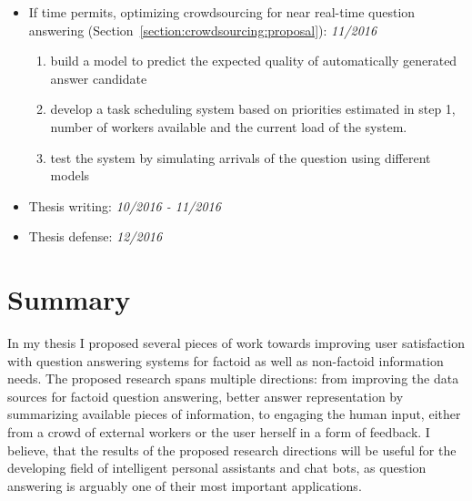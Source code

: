 \begin{itemize}
\item If time permits, optimizing crowdsourcing for near real-time question answering (Section~\ref{section:crowdsourcing:proposal}): \textit{11/2016}
\begin{enumerate}
	\item build a model to predict the expected quality of automatically generated answer candidate
	\item develop a task scheduling system based on priorities estimated in step 1, number of workers available and the current load of the system.
	\item test the system by simulating arrivals of the question using different models
\end{enumerate}


\item Thesis writing: \textit{10/2016 - 11/2016}
\item Thesis defense: \textit{12/2016}
\end{itemize}

\section{Summary}
\label{section:proposal:summary}

In my thesis I proposed several pieces of work towards improving user satisfaction with question answering systems for factoid as well as non-factoid information needs.
The proposed research spans multiple directions: from improving the data sources for factoid question answering, better answer representation by summarizing available pieces of information, to engaging the human input, either from a crowd of external workers or the user herself in a form of feedback.
I believe, that the results of the proposed research directions will be useful for the developing field of intelligent personal assistants and chat bots, as question answering is arguably one of their most important applications.
